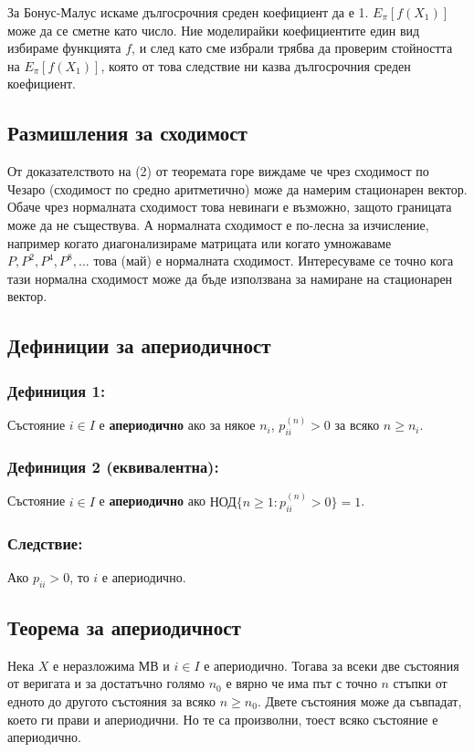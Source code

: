 \documentclass{article}
\begin{document}
За Бонус-Малус искаме дългосрочния среден коефициент да е 1. $E_\pi[f(X_1)]$ може да се сметне като число. 
Ние моделирайки коефициентите един вид избираме функцията $f$, и след като сме избрали трябва да проверим 
стойността на $E_\pi[f(X_1)]$, която от това следствие ни казва дългосрочния среден коефициент.

\subsection{Размишления за сходимост}
От доказателството на (2) от теоремата горе виждаме че чрез сходимост по Чезаро (сходимост 
по средно аритметично) може да намерим стационарен вектор. Обаче чрез нормалната сходимост това невинаги е възможно, 
защото границата може да не съществува. А нормалната сходимост е по-лесна за изчисление, например когато 
диагонализираме матрицата или когато умножаваме $P, P^2, P^4, P^8,...$ това (май) е нормалната сходимост. 
Интересуваме се точно кога тази нормална сходимост може да бъде използвана за намиране на стационарен вектор.

\subsection{Дефиниции за апериодичност}
\subsubsection*{Дефиниция 1:}
Състояние $i \in I$ е \textbf{апериодично} ако за някое $n_i$, $p_{ii}^{(n)} > 0$ за всяко $n \geq n_i$.

\subsubsection*{Дефиниция 2 (еквивалентна):}
Състояние $i \in I$ е \textbf{апериодично} ако $\text{НОД}\{n \geq 1 : p_{ii}^{(n)} > 0\} = 1$.

\subsubsection*{Следствие:}
Ако $p_{ii} > 0$, то $i$ е апериодично.

\subsection{Теорема за апериодичност}
Нека $X$ е неразложима МВ и $i \in I$ е апериодично. Тогава за всеки две състояния от веригата и за достатъчно 
голямо $n_0$ е вярно че има път с точно $n$ стъпки от едното до другото състояния за всяко $n \geq n_0$. 
Двете състояния може да съвпадат, което ги прави и апериодични. Но те са произволни, тоест всяко състояние е апериодично.
\end{document}
